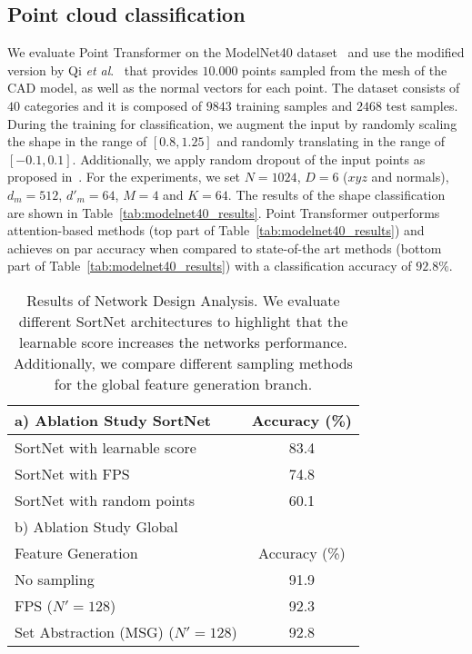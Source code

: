 \documentclass{ieeeaccess}
\begin{document}
\subsection{Point cloud classification}

We evaluate Point Transformer on the ModelNet40 dataset~\cite{wu20153d} and use the modified version by Qi \textit{et al}.~\cite{qi2017pointnet++} that provides $10.000$ points sampled from the mesh of the CAD model, as well as the normal vectors for each point. The dataset consists of $40$ categories and it is composed of $9843$ training samples and $2468$ test samples. During the training for classification, we augment the input by randomly scaling the shape in the range of $[0.8, 1.25]$ and randomly translating in the range of $[-0.1, 0.1]$. Additionally, we apply random dropout of the input points as proposed in~\cite{qi2017pointnet,qi2017pointnet++}. For the experiments, we set $N=1024$, $D = 6$ ($xyz$ and normals), $d_m = 512$, $d'_m = 64$, $M=4$ and $K=64$.
The results of the shape classification are shown in Table~\ref{tab:modelnet40_results}. Point Transformer outperforms attention-based methods (top part of Table~\ref{tab:modelnet40_results}) and achieves on par accuracy when compared to state-of-the art methods (bottom part of Table~\ref{tab:modelnet40_results}) with a classification accuracy of $92.8\%$.


\begin{table}[!t]
    \centering
        \caption{Results of Network Design Analysis. We evaluate different SortNet architectures to highlight that the learnable score increases the networks performance. Additionally, we compare different sampling methods for the global feature generation branch.}
        \label{tab:ablation_study_1}
        \begin{tabular}{@{}lc@{}}
            \toprule
            a) Ablation Study SortNet & \multicolumn{1}{l}{Accuracy (\%)} \\ \midrule
            SortNet with learnable score  & 83.4 \\
            SortNet with FPS & 74.8 \\
            SortNet with random points  & 60.1 \\
            \toprule
            b) Ablation Study Global  & \\
            Feature Generation & Accuracy (\%) \\ \midrule
            No sampling & 91.9 \\
            FPS ($N'=128$) & 92.3 \\
            Set Abstraction (MSG) ($N'=128$) & 92.8 \\
            \bottomrule
        \end{tabular}
 \end{table}
 
\end{document}
